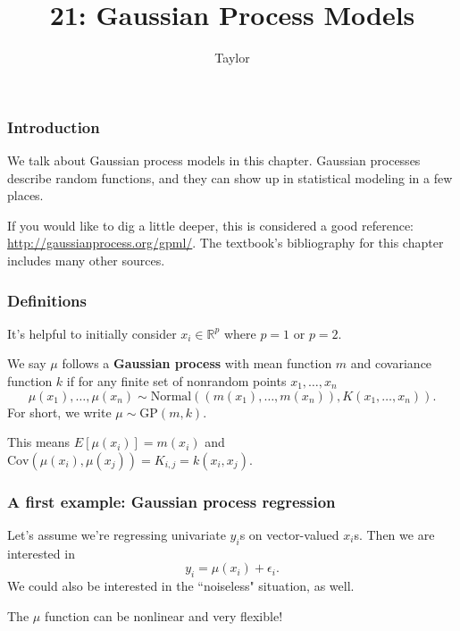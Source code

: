 \documentclass{beamer}
\title["21"]{21: Gaussian Process Models}
\author{Taylor}
\institute[UVA] 
{
University of Virginia \\
\medskip
\textit{} 
}
\date{}
\begin{document}

\begin{frame}
\titlepage 
\end{frame}

\begin{frame}
\frametitle{Introduction}

We talk about Gaussian process models in this chapter. Gaussian processes describe random functions, and they can show up in statistical modeling in a few places. 
\newline

If you would like to dig a little deeper, this is considered a good reference: \url{http://gaussianprocess.org/gpml/}. The textbook's bibliography for this chapter includes many other sources.

\end{frame}
\begin{frame}
\frametitle{Definitions}

It's helpful to initially consider $x_i \in \mathbb{R}^p$ where $p=1$ or $p=2$.
\newline

We say $\mu$ follows a {\bf Gaussian process} with mean function $m$ and covariance function $k$ if for any finite set of nonrandom points $x_1, \ldots, x_n$
$$
\mu(x_1), \ldots, \mu(x_n) \sim \text{Normal}( (m(x_1), \ldots, m(x_n)), K(x_1, \ldots, x_n)).
$$
For short, we write $\mu \sim \text{GP}(m,k)$. 
\pause
\newline

This means $E[\mu(x_i)] = m(x_i)$ and $\text{Cov}(\mu(x_i), \mu(x_j)) = K_{i,j} = k(x_i,x_j)$.
\newline


\end{frame}

\begin{frame}
\frametitle{A first example: Gaussian process regression}

Let's assume we're regressing univariate $y_i$s on vector-valued $x_i$s. Then we are interested in 
$$
y_i = \mu(x_i) + \epsilon_i.
$$
We could also be interested in the ``noiseless" situation, as well. 
\newline

The $\mu$ function can be nonlinear and very flexible!

\end{frame}
\end{document}

